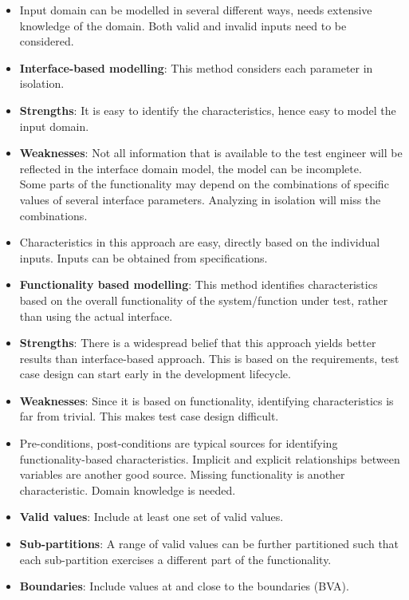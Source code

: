 \documentclass[a4paper]{article}
\begin{document}
\begin{itemize}
\begin{enumerate}
    \end{enumerate}
    \item Input domain can be modelled in several different ways, needs extensive knowledge of the domain. Both valid and invalid inputs need to be considered.
    \item \textbf{Interface-based modelling}: This method considers each parameter in isolation.
    \item \textbf{Strengths}: It is easy to identify the characteristics, hence easy to model the input domain.
    \item \textbf{Weaknesses}: Not all information that is available to the test engineer will be reflected in the interface domain model, the model can be incomplete.\\
    Some parts of the functionality may depend on the combinations of specific values of several interface parameters. Analyzing in isolation will miss the combinations.
    \item Characteristics in this approach are easy, directly based on the individual inputs. Inputs can be obtained from specifications.
    \item \textbf{Functionality based modelling}: This method identifies characteristics based on the overall functionality of the system/function under test, rather than using the actual interface.
    \item \textbf{Strengths}: There is a widespread belief that this approach yields better results than interface-based approach. This is based on the requirements, test case design can start early in the development lifecycle.
    \item \textbf{Weaknesses}: Since it is based on functionality, identifying characteristics is far from trivial. This makes test case design difficult.
    \item Pre-conditions, post-conditions are typical sources for identifying functionality-based characteristics. Implicit and explicit relationships between variables are another good source. Missing functionality is another characteristic. Domain knowledge is needed.
    \item \textbf{Valid values}: Include at least one set of valid values.
    \item \textbf{Sub-partitions}: A range of valid values can be further partitioned such that each sub-partition exercises a different part of the functionality.
    \item \textbf{Boundaries}: Include values at and close to the boundaries (BVA).

\end{itemize}
\end{document}
